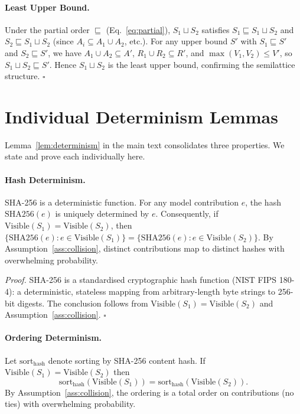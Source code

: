 \documentclass[10pt,letterpaper]{article}
\begin{document}
\paragraph{Least Upper Bound.}
Under the partial order $\sqsubseteq$ (Eq.~\ref{eq:partial}), $S_1 \sqcup S_2$ satisfies $S_1 \sqsubseteq S_1 \sqcup S_2$ and $S_2 \sqsubseteq S_1 \sqcup S_2$ (since $A_i \subseteq A_1 \cup A_2$, etc.).
For any upper bound $S'$ with $S_1 \sqsubseteq S'$ and $S_2 \sqsubseteq S'$, we have $A_1 \cup A_2 \subseteq A'$, $R_1 \cup R_2 \subseteq R'$, and $\max(V_1,V_2) \leq V'$, so $S_1 \sqcup S_2 \sqsubseteq S'$.
Hence $S_1 \sqcup S_2$ is the least upper bound, confirming the semilattice structure. $\square$

\section{Individual Determinism Lemmas}\label{app:determinism_lemmas}

Lemma~\ref{lem:determinism} in the main text consolidates three properties.  We state and prove each individually here.

\paragraph{Hash Determinism.}
SHA-256 is a deterministic function.
For any model contribution $e$, the hash $\mathrm{SHA256}(e)$ is uniquely determined by $e$.
Consequently, if $\mathrm{Visible}(S_1) = \mathrm{Visible}(S_2)$, then $\{\mathrm{SHA256}(e) : e \in \mathrm{Visible}(S_1)\} = \{\mathrm{SHA256}(e) : e \in \mathrm{Visible}(S_2)\}$.
By Assumption~\ref{ass:collision}, distinct contributions map to distinct hashes with overwhelming probability.

\emph{Proof.}
SHA-256 is a standardised cryptographic hash function (NIST FIPS 180-4): a deterministic, stateless mapping from arbitrary-length byte strings to 256-bit digests.
The conclusion follows from $\mathrm{Visible}(S_1) = \mathrm{Visible}(S_2)$ and Assumption~\ref{ass:collision}. $\square$

\paragraph{Ordering Determinism.}
Let $\mathrm{sort}_{\mathrm{hash}}$ denote sorting by SHA-256 content hash.
If $\mathrm{Visible}(S_1) = \mathrm{Visible}(S_2)$ then
\[
\mathrm{sort}_{\mathrm{hash}}(\mathrm{Visible}(S_1)) = \mathrm{sort}_{\mathrm{hash}}(\mathrm{Visible}(S_2)).
\]
By Assumption~\ref{ass:collision}, the ordering is a total order on contributions (no ties) with overwhelming probability.
\end{document}
